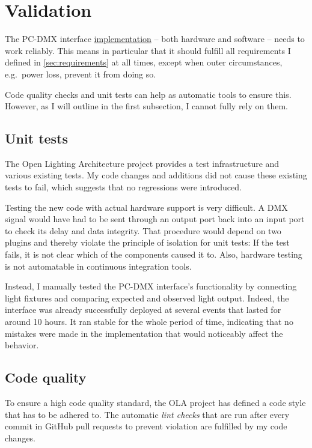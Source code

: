 \cleardoublepage\hypertarget{sec:testing}{\chapter{Validation}\label{sec:testing}}

The PC-DMX interface
\protect\hyperlink{sec:implementation}{implementation} -- both hardware
and software -- needs to work reliably. This means in particular that it
should fulfill all requirements I defined in \cref{sec:requirements} at
all times, except when outer circumstances, e.g.~power loss, prevent it
from doing so.

Code quality checks and unit tests can help as automatic tools to ensure
this. However, as I will outline in the first subsection, I cannot fully
rely on them.

\section{Unit tests}\label{unit-tests}

The Open Lighting Architecture project provides a test infrastructure
and various existing tests. My code changes and additions did not cause
these existing tests to fail, which suggests that no regressions were
introduced.

Testing the new code with actual hardware support is very difficult. A
DMX signal would have had to be sent through an output port back into an
input port to check its delay and data integrity. That procedure would
depend on two plugins and thereby violate the principle of isolation for
unit tests: If the test fails, it is not clear which of the components
caused it to. Also, hardware testing is not automatable in continuous
integration tools.

Instead, I manually tested the PC-DMX interface's functionality by
connecting light fixtures and comparing expected and observed light
output. Indeed, the interface was already successfully deployed at
several events that lasted for around 10 hours. It ran stable for the
whole period of time, indicating that no mistakes were made in the
implementation that would noticeably affect the behavior.

\section{Code quality}\label{code-quality}

To ensure a high code quality standard, the OLA project has defined a
code style that has to be adhered to. The automatic \emph{lint checks}
that are run after every commit in GitHub pull requests to prevent
violation are fulfilled by my code changes.

